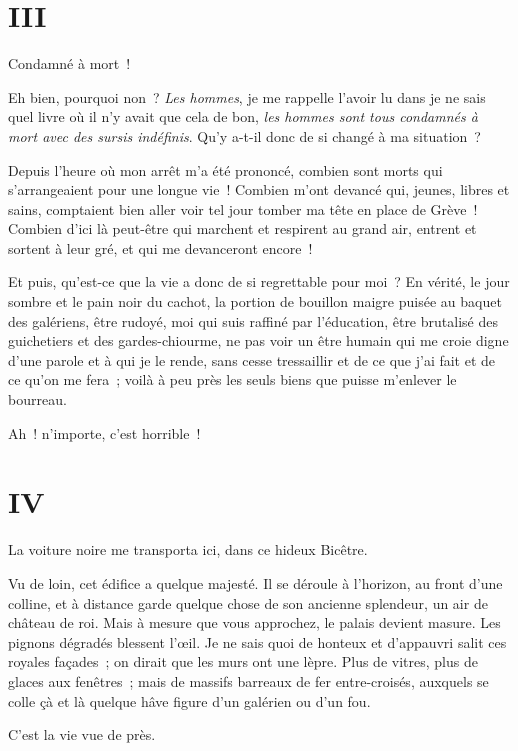 \documentclass[french,twoside]{book} %
\begin{document}
 \section[{III}]{III}
\label{ch3}\renewcommand{\leftmark}{III}

\noindent Condamné à mort !\par
Eh bien, pourquoi non ? \emph{Les hommes}, je me rappelle l’avoir lu dans je ne sais quel livre où il n’y avait que cela de bon, \emph{les hommes sont tous condamnés à mort avec des sursis indéfinis}. Qu’y a-t-il donc de si changé à ma situation ?\par
Depuis l’heure où mon arrêt m’a été prononcé, combien sont morts qui s’arrangeaient pour une longue vie ! Combien m’ont devancé qui, jeunes, libres et sains, comptaient bien aller voir tel jour tomber ma tête en place de Grève ! Combien d’ici là peut-être qui marchent et respirent au grand air, entrent et sortent à leur gré, et qui me devanceront encore !\par
Et puis, qu’est-ce que la vie a donc de si regrettable pour moi ? En vérité, le jour sombre et le pain noir du cachot, la portion de bouillon maigre puisée au baquet des galériens, être rudoyé, moi qui suis  raffiné par l’éducation, être brutalisé des guichetiers et des gardes-chiourme, ne pas voir un être humain qui me croie digne d’une parole et à qui je le rende, sans cesse tressaillir et de ce que j’ai fait et de ce qu’on me fera ; voilà à peu près les seuls biens que puisse m’enlever le bourreau.\par
Ah ! n’importe, c’est horrible !
 \section[{IV}]{IV}
\label{ch4}\renewcommand{\leftmark}{IV}

\noindent La voiture noire me transporta ici, dans ce hideux Bicêtre.\par
Vu de loin, cet édifice a quelque majesté. Il se déroule à l’horizon, au front d’une colline, et à distance garde quelque chose de son ancienne splendeur, un air de château de roi. Mais à mesure que vous approchez, le palais devient masure. Les pignons dégradés blessent l’œil. Je ne sais quoi de honteux et d’appauvri salit ces royales façades ; on dirait que les murs ont une lèpre. Plus de vitres, plus de glaces aux fenêtres ; mais de massifs barreaux de fer entre-croisés, auxquels se colle çà et là quelque hâve figure d’un galérien ou d’un fou.\par
C’est la vie vue de près.
\end{document}
